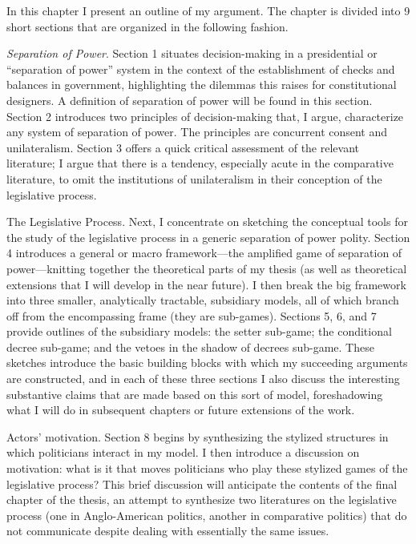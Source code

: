 In this chapter I present an outline of my argument.  The chapter is divided into 9 short sections that are organized in the following fashion.  

\emph{Separation of Power}.  Section 1 situates decision-making in a presidential or ``separation of power'' system in the context of the establishment of checks and balances in government, highlighting the dilemmas this raises for constitutional designers.  A definition of separation of power will be found in this section.  Section 2 introduces two principles of decision-making that, I argue, characterize any system of separation of power.  The principles are concurrent consent and unilateralism.  Section 3 offers a quick critical assessment of the relevant literature; I argue that there is a tendency, especially acute in the comparative literature, to omit the institutions of unilateralism in their conception of the legislative process.  

The Legislative Process.  Next, I concentrate on sketching the conceptual tools for the study of the legislative process in a generic separation of power polity.  Section 4 introduces a general or macro framework---the amplified game of separation of power---knitting together the theoretical parts of my thesis (as well as theoretical extensions that I will develop in the near future).  I then break the big framework into three smaller, analytically tractable, subsidiary models, all of which branch off from the encompassing frame (they are sub-games).  Sections 5, 6, and 7 provide outlines of the subsidiary models: the setter sub-game; the conditional decree sub-game; and the vetoes in the shadow of decrees sub-game.  These sketches introduce the basic building blocks with which my succeeding arguments are constructed, and in each of these three sections I also discuss the interesting substantive claims that are made based on this sort of model, foreshadowing what I will do in subsequent chapters or future extensions of the work.  

Actors' motivation.  Section 8 begins by synthesizing the stylized structures in which politicians interact in my model.  I then introduce a discussion on motivation: what is it that moves politicians who play these stylized games of the legislative process?  This brief discussion will anticipate the contents of the final chapter of the thesis, an attempt to synthesize two literatures on the legislative process (one in Anglo-American politics, another in comparative politics) that do not communicate despite dealing with essentially the same issues.  


